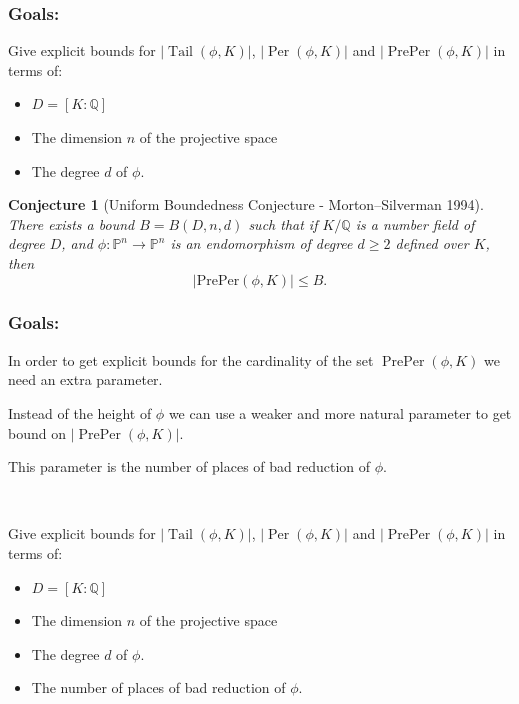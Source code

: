 \documentclass{beamer}
\def\jump{ \quad \\ \vspace{0.7cm} \pause}
\def\QQ{{\mathbb Q}}
\DeclareMathOperator{\Tail}{Tail}
\DeclareMathOperator{\Per}{Per}
\DeclareMathOperator{\PrePer}{PrePer}
\theoremstyle{thmstyle}
\theoremstyle{thmstyle}
\theoremstyle{mystyle}
\newtheorem*{conjecture}{Conjecture}
\theoremstyle{qstnstyle}
\begin{document}
\begin{frame}
\frametitle{Goals:}
Give explicit bounds for $|\Tail(\phi,K)|$, $|\Per(\phi,K)|$ and $|\PrePer(\phi,K)|$ in terms of:\pause
\begin{itemize}
\item  $D=[K: \QQ]$\pause 

\item The dimension $n$ of the projective space \pause 

\item The degree $d$ of $\phi$.
\end{itemize}

\pause

\begin{conjecture}[Uniform Boundedness Conjecture - Morton--Silverman
  1994]
There exists a bound $B = B(D,n,d)$ such that if $K/\mathbb{Q}$ is a number field of degree $D$, and $\phi:\mathbb{P}^n\rightarrow\mathbb{P}^n$ is an endomorphism of degree $d\geq{2}$ defined over $K$, then 
$$|\text{PrePer}(\phi,K)| \leq B.$$
\end{conjecture}
\end{frame}

\begin{frame}
\frametitle{Goals:}

In order to get explicit bounds for the cardinality of the set $\PrePer(\phi,K)$ we need an extra parameter. 

Instead of the height of $\phi$ we can use a weaker and more natural parameter to get bound on $|\PrePer(\phi,K)|$.\pause 

This parameter is the number of places of bad reduction of $\phi$.


\jump

Give explicit bounds for $|\Tail(\phi,K)|$, $|\Per(\phi,K)|$ and $|\PrePer(\phi,K)|$ in terms of:
\begin{itemize}
\item  $D=[K: \QQ]$ 

\item The dimension $n$ of the projective space  

\item The degree $d$ of $\phi$.

\item The number of places of bad reduction of $\phi$.
\end{itemize}


\end{frame}
\end{document}

